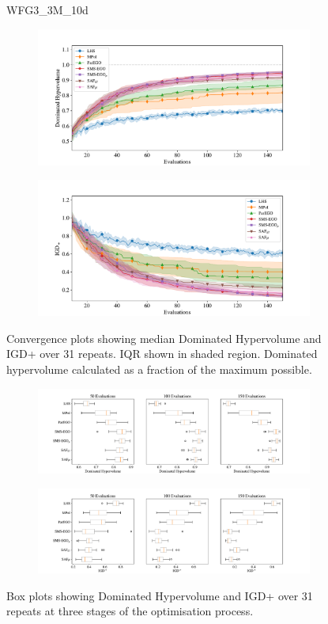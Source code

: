 \documentclass[conference]{IEEEtran}
\begin{document}
\begin{figure}
WFG3\_3M\_10d


\begin{subfigure}[hbt!]{\linewidth}

    \centering
    \includegraphics[width=0.7\linewidth]{figures/wfg3_3obj_10dim_hv_plot.pdf}
\end{subfigure}
\begin{subfigure}[h]{\linewidth}
    \centering
    \includegraphics[width=0.7\linewidth]{figures/wfg3_3obj_10dim_igd_plot.pdf}
\end{subfigure}
    \caption{Convergence plots showing median Dominated Hypervolume and IGD+ over 31 repeats. IQR shown in shaded region. Dominated hypervolume calculated as a fraction of the maximum possible.}
\vspace{\floatsep}
\begin{subfigure}[t]{\linewidth}
    \centering
    \includegraphics[width=0.8\linewidth]{figures/wfg3_3obj_10dim_hv_boxplot.pdf}
\end{subfigure}
\begin{subfigure}[t]{\linewidth}
    \centering
    \includegraphics[width=0.8\linewidth]{figures/wfg3_3obj_10dim_igd_boxplot.pdf}
\end{subfigure}
    \caption{Box plots showing Dominated Hypervolume and IGD+ over 31 repeats at three stages of the optimisation process.}
\end{figure}
\clearpage
\end{document}
